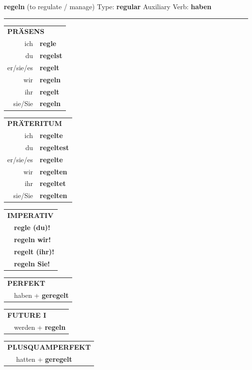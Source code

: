 \documentclass[10pt,a4paper]{revtex4-2}
\begin{document}
\begin{verbbox}
{\Large \bf regeln} (to regulate / manage) \hfill Type: \textbf{regular} \hfill Auxiliary Verb: \textbf{haben} 

\vspace{5pt}
\hrule
\vspace{5pt}

\begin{tabular}{rl}
\multicolumn{2}{l}{\textbf{PRÄSENS}}\\
ich & \textbf{regle}\\
du & \textbf{regelst}\\
er/sie/es & \textbf{regelt}\\
wir & \textbf{regeln}\\
ihr & \textbf{regelt}\\
sie/Sie & \textbf{regeln}\\
\end{tabular}
\hfill
\begin{tabular}{rl}
\multicolumn{2}{l}{\textbf{PRÄTERITUM}}\\
ich & \textbf{regelte}\\
du & \textbf{regeltest}\\
er/sie/es & \textbf{regelte}\\
wir & \textbf{regelten}\\
ihr & \textbf{regeltet}\\
sie/Sie & \textbf{regelten}\\
\end{tabular}
\hfill
\begin{tabular}{rl}
\multicolumn{2}{l}{\textbf{IMPERATIV}}\\
& \textbf{regle (du)!}\\
& \textbf{regeln wir!}\\
& \textbf{regelt (ihr)!}\\
& \textbf{regeln Sie!}\\
\end{tabular}

\vspace{10pt}

\begin{tabular}{rl}
\multicolumn{2}{l}{\textbf{PERFEKT}}\\
& haben + \textbf{geregelt}\\
\end{tabular}
\hfill
\begin{tabular}{rl}
\multicolumn{2}{l}{\textbf{FUTURE I}}\\
& werden + \textbf{regeln}\\
\end{tabular}
\hfill
\begin{tabular}{rl}
\multicolumn{2}{l}{\textbf{PLUSQUAMPERFEKT}}\\
& hatten + \textbf{geregelt}\\
\end{tabular}


\end{verbbox}
\end{document}
